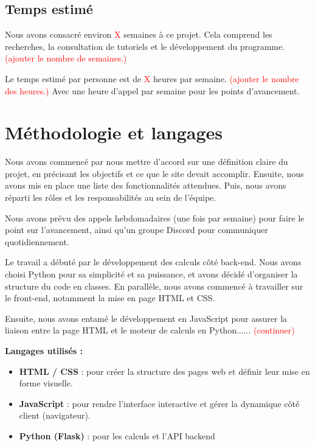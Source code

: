 \documentclass{article}
\begin{document}
	\subsection{Temps estimé}
	
	Nous avons consacré environ \textcolor{red}{X} semaines à ce projet. Cela comprend les recherches, la consultation de tutoriels et le développement du programme. \textcolor{red}{(ajouter le nombre de semaines.)}
	
	Le temps estimé par personne est de \textcolor{red}{X} heures par semaine. \textcolor{red}{(ajouter le nombre des heures.)} Avec une heure d’appel par semaine pour les points d’avancement.


	
	\section{Méthodologie et langages}
	
	Nous avons commencé par nous mettre d’accord sur une définition claire du projet, en précisant les objectifs et ce que le site devait accomplir. Ensuite, nous avons mis en place une liste des fonctionnalités attendues. Puis, nous avons réparti les rôles et les responsabilités au sein de l’équipe.
	
	Nous avons prévu des appels hebdomadaires (une fois par semaine) pour faire le point sur l’avancement, ainsi qu’un groupe Discord pour communiquer quotidiennement.
	
	Le travail a débuté par le développement des calculs côté back-end. Nous avons choisi Python pour sa simplicité et sa puissance, et avons décidé d’organiser la structure du code en classes. En parallèle, nous avons commencé à travailler sur le front-end, notamment la mise en page HTML et CSS.
	
	Ensuite, nous avons entamé le développement en JavaScript pour assurer la liaison entre la page HTML et le moteur de calculs en Python...... \textcolor{red}{(continuer)}
	
	\vspace{0.4cm}
	\textbf{Langages utilisés :}
	\begin{itemize}
		\item \textbf{HTML / CSS} : pour créer la structure des pages web et définir leur mise en forme visuelle.
		\item \textbf{JavaScript} : pour rendre l’interface interactive et gérer la dynamique côté client (navigateur).
		\item \textbf{Python (Flask)} : pour les calculs et l’API backend
	\end{itemize}
	
\end{document}
